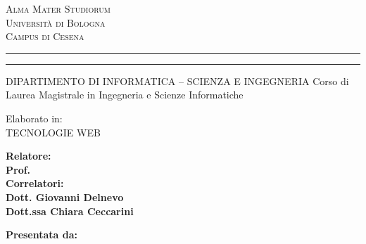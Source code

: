 \begin{titlepage}
\begin{center}
{{\Large{\textsc{Alma Mater Studiorum}}}\\
{\Large{\textsc{Universit\`a di Bologna}}} \\
{\textsc{Campus di Cesena}} \rule[0.1cm]{14cm}{0.1mm}
		\rule[0.5cm]{14cm}{0.6mm}
DIPARTIMENTO DI INFORMATICA – SCIENZA E INGEGNERIA
\color{red}Corso di Laurea Magistrale in Ingegneria e Scienze Informatiche }
\end{center}
\vspace{10mm}
\begin{center}
\end{center}
\vspace{10mm}
\begin{center}
 {\large{ Elaborato in:\\
\color{red}TECNOLOGIE WEB\\}}   
\end{center}
\vspace{20mm}
\par
\noindent
\begin{minipage}[t]{0.47\textwidth}
{\large{\bf Relatore:\\
\color{red}Prof.\\
\xsupervisor}}
\vspace{2mm} %
\newline
{\large{\bf Correlatori:\\
\color{red}Dott. Giovanni Delnevo\\
Dott.ssa Chiara Ceccarini}}
\end{minipage}
\hfill
\begin{minipage}[t]{0.47\textwidth}\raggedleft
{\large{\bf Presentata da:\\
\color{red}\xstudent}}
\end{minipage}
\vspace{12mm}
\begin{center}
\end{center}
\end{titlepage}
